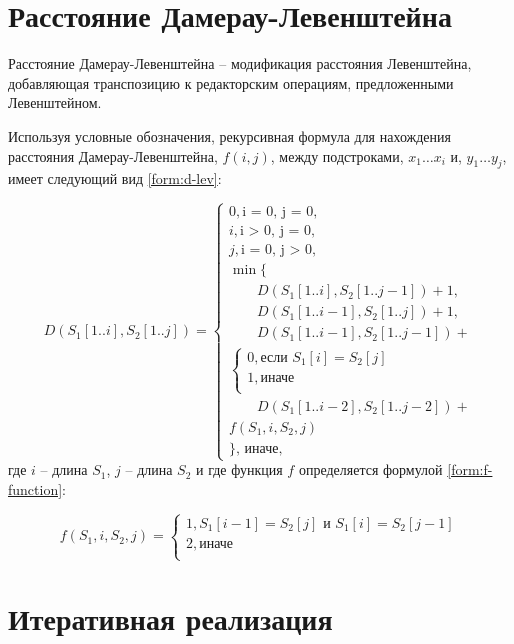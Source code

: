 \section{Расстояние Дамерау-Левенштейна}

Расстояние Дамерау-Левенштейна -- модификация расстояния Левенштейна, добавляющая транспозицию к редакторским операциям, предложенными Левенштейном.

Используя условные обозначения, рекурсивная формула для нахождения расстояния Дамерау-Левенштейна, $f(i, j)$, между подстроками, $x_1 \dots x_i$ и, $y_1 \dots y_j$, имеет следующий вид \ref{form:d-lev}:

\begin{equation}
	\label{form:d-lev}
	D(S_1[1..i], S_2[1..j]) = 
	\begin{cases}
		0, \text{i = 0, j = 0,}\\
	  	i, \text{i > 0, j = 0,}\\
	  	j, \text{i = 0, j > 0,}\\
	  	\min \lbrace \\
	  	\qquad D(S_1[1..i], S_2[1..j - 1]) + 1,\\
	  	\qquad D(S_1[1..i - 1], S_2[1..j]) + 1,\\
	  	\qquad D(S_1[1..i - 1], S_2[1..j - 1]) + 
	  	\\
	  	\begin{cases}
			0, \text{если }S_1[i] = S_2[j]\\
			1, \text{иначе}\\
	  	\end{cases}\\
	  	\qquad D(S_1[1..i - 2], S_2[1..j - 2]) + \\f(S_1, i, S_2, j)\\
	  	\rbrace \text{, иначе,}
	\end{cases}
\end{equation} 
где $i$ -- длина $S_1$, $j$ -- длина $S_2$ и где функция $f$ определяется формулой \ref{form:f-function}:  
  
\begin{equation}
	\label{form:f-function}
	f(S_1, i, S_2, j) = 
	\begin{cases}
		1, S_1[i-1] = S_2[j] \text{ и } S_1[i] = S_2[j - 1]\\
	  	2, \text{иначе}\\
	\end{cases}
\end{equation}

\section{Итеративная реализация}

